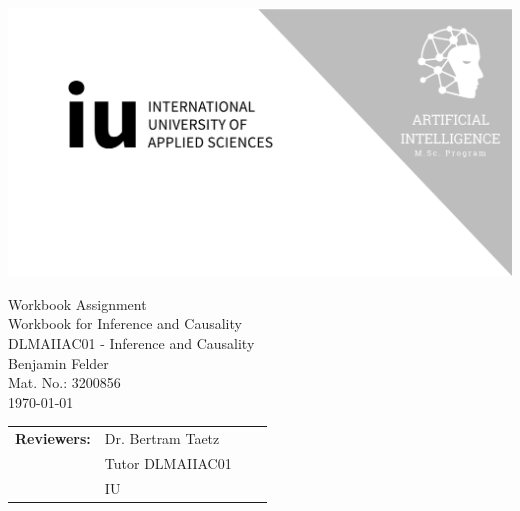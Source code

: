 

\def\Mytitle{Workbook for Inference and Causality}
\def\Mysubtitle{Workbook Assignment}
\def\Mycourse{DLMAIIAC01 - Inference and Causality}
\def\Myauthor{Benjamin Felder}
\def\MyMatricNum{3200856}


\def\RNameA{Dr. Bertram Taetz}
\def\RFunctionA{Tutor DLMAIIAC01}
\def\RInstitutionA{IU}

\def\RNameB{}
\def\RFunctionB{}
\def\RInstitutionB{}

\def\RNameC{}
\def\RFunctionC{}
\def\RInstitutionC{}

\thispagestyle{empty}

\centerline{\includegraphics[width=\paperwidth]{template/img/cover-image.png}}

\vspace{8.5em}

{\Large \Mysubtitle}\\
{\Huge \Mytitle}\\
{\LARGE \Mycourse}\\
{\LARGE \Myauthor}\\
{\Large Mat. No.: \MyMatricNum}\\
{\germandt\today}

\vspace*{\fill}

\begin{tabular}{p{0.8in} p{1.5in} p{1.5in} p{1.5in}}
    \textbf{Reviewers:} & \RNameA        & \RNameB        & \RNameC        \\
                        & \RFunctionA    & \RFunctionB    & \RFunctionC    \\
                        & \RInstitutionA & \RInstitutionB & \RInstitutionC
\end{tabular}


\restoregeometry
\clearpage
